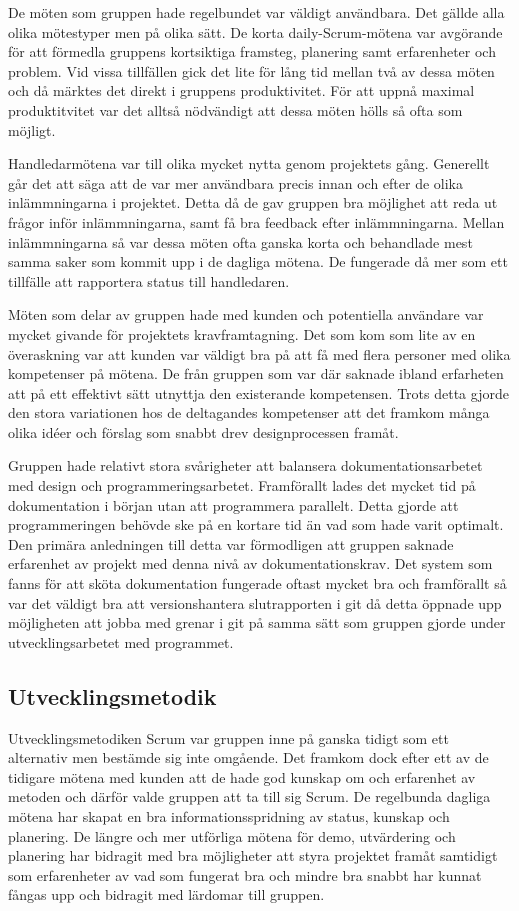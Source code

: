 De möten som gruppen hade regelbundet var väldigt användbara. Det gällde alla olika mötestyper men på olika sätt. De korta daily-Scrum-mötena var avgörande för att förmedla gruppens kortsiktiga framsteg, planering samt erfarenheter och problem. Vid vissa tillfällen gick det lite för lång tid mellan två av dessa möten och då märktes det direkt i gruppens produktivitet. För att uppnå maximal produktitvitet var det alltså nödvändigt att dessa möten hölls så ofta som möjligt.

Handledarmötena var till olika mycket nytta genom projektets gång. Generellt går det att säga att de var mer användbara precis innan och efter de olika inlämmningarna i projektet. Detta då de gav gruppen bra möjlighet att reda ut frågor inför inlämmningarna, samt få bra feedback efter inlämmningarna.
Mellan inlämmningarna så var dessa möten ofta ganska korta och behandlade mest samma saker som kommit upp i de dagliga mötena. De fungerade då mer som ett tillfälle att rapportera status till handledaren.

Möten som delar av gruppen hade med kunden och potentiella användare var mycket givande för projektets kravframtagning. Det som kom som lite av en överaskning var att kunden var väldigt bra på att få med flera personer med olika kompetenser på mötena. De från gruppen som var där saknade ibland erfarheten att på ett effektivt sätt utnyttja den existerande kompetensen.
Trots detta gjorde den stora variationen hos de deltagandes kompetenser att det framkom många olika idéer och förslag som snabbt drev designprocessen framåt.

Gruppen hade relativt stora svårigheter att balansera dokumentationsarbetet med design och programmeringsarbetet. Framförallt lades det mycket tid på dokumentation i början utan att programmera parallelt. Detta gjorde att programmeringen behövde ske på en kortare tid än vad som hade varit optimalt. Den primära anledningen till detta var förmodligen att gruppen saknade erfarenhet av projekt med denna nivå av dokumentationskrav. Det system som fanns för att sköta dokumentation fungerade oftast mycket bra och framförallt så var det väldigt bra att versionshantera slutrapporten i git då detta öppnade upp möjligheten att jobba med grenar i git på samma sätt som gruppen gjorde under utvecklingsarbetet med programmet.

\subsection{Utvecklingsmetodik}
Utvecklingsmetodiken Scrum var gruppen inne på ganska tidigt som ett alternativ men bestämde sig inte omgående. Det framkom dock efter ett av de tidigare mötena med kunden att de hade god kunskap om och erfarenhet av metoden och därför valde gruppen att ta till sig Scrum. De regelbunda dagliga mötena har skapat en bra informationsspridning av status, kunskap och planering. De längre och mer utförliga mötena för demo, utvärdering och planering har bidragit med bra möjligheter att styra projektet framåt samtidigt som erfarenheter av vad som fungerat bra och mindre bra snabbt har kunnat fångas upp och bidragit med lärdomar till gruppen.

